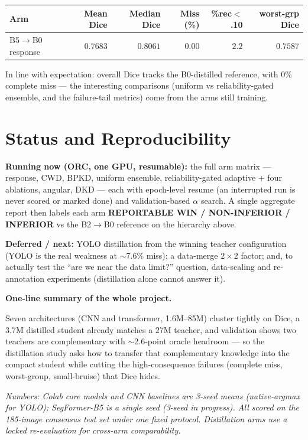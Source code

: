 \documentclass[11pt]{article}
\begin{document}
\begin{center}\small
\begin{tabular}{l R R R R R}
\toprule
Arm & Mean Dice & Median Dice & Miss (\%) & \%rec$<$.10 & worst-grp Dice \\
\midrule
B5$\to$B0 response & $0.7683$ & $0.8061$ & $0.00$ & $2.2$ & $0.7587$ \\
\bottomrule
\end{tabular}
\end{center}

\noindent In line with expectation: overall Dice tracks the B0-distilled reference, with $0\%$
complete miss --- the interesting comparisons (uniform vs reliability-gated ensemble, and the
failure-tail metrics) come from the arms still training.

\section{Status and Reproducibility}

\textbf{Running now (ORC, one GPU, resumable):} the full arm matrix --- response, CWD, BPKD,
uniform ensemble, reliability-gated adaptive + four ablations, angular, DKD --- each with
epoch-level resume (an interrupted run is never scored or marked done) and validation-based
$\alpha$ search. A single aggregate report then labels each arm
\textbf{REPORTABLE WIN / NON-INFERIOR / INFERIOR} vs the B2$\to$B0 reference on the hierarchy above.

\textbf{Deferred / next:} YOLO distillation from the winning teacher configuration (YOLO is the
real weakness at $\sim$7.6\% miss); a data-merge $2\times2$ factor; and, to actually test the
``are we near the data limit?'' question, data-scaling and re-annotation experiments (distillation
alone cannot answer it).

\textbf{One-line summary of the whole project.}
\begin{keybox}
Seven architectures (CNN and transformer, 1.6M--85M) cluster tightly on Dice, a 3.7M distilled
student already matches a 27M teacher, and validation shows two teachers are complementary with
$\sim$2.6-point oracle headroom --- so the distillation study asks how to transfer that complementary
knowledge into the compact student while cutting the high-consequence failures (complete miss,
worst-group, small-bruise) that Dice hides.
\end{keybox}

\vfill
\begin{center}\footnotesize\itshape
Numbers: Colab core models and CNN baselines are 3-seed means (native-argmax for YOLO);
SegFormer-B5 is a single seed (3-seed in progress). All scored on the 185-image consensus test set
under one fixed protocol. Distillation arms use a locked re-evaluation for cross-arm comparability.
\end{center}
\end{document}
